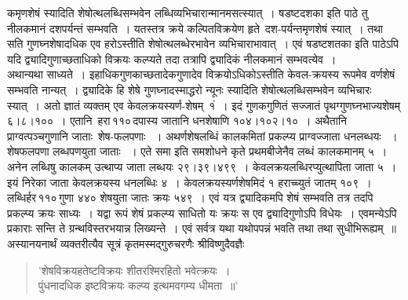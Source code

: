 \documentclass[11pt, openany]{book}
\begin{document}
\begin{sloppypar}
\noindent कमृणशेषं स्यादिति शेषोत्थलब्धिसम्भवेन लब्धिव्यभिचारान्मानमसत्स्यात्~। षडष्टदशका इति पाठे तु नीलकमानं दशपर्यन्तं सम्भवति~। यतस्तत्र क्रये कल्पितविक्रयेण हृते~दश-पर्यन्तमृणशेषं स्यात्~। तथा सति गुणघ्नशेषादधिक एव हरोऽस्तीति शेषोत्थलब्धेरभावेन व्यभिचाराभावात्~। एवं षडष्टशतका इति पाठेऽपि यदि द्व्यादिगुणाच्छताधिको विक्रयः कल्प्यते तदा तत्रापि द्व्यादिकं नीलकमानं सम्भवत्येव~।\\

अथान्यथा साध्यते~। इहाधिकगुणकाच्छतादेकगुणादेव विक्रयोऽधिकोऽस्तीति केवल-क्रयस्य रूपमेव वर्णशेषं सम्भवति नान्यत्~। द्व्यादिके हि शेषे गुणघ्नादस्माद्धरो न्यूनः स्यादिति शेषोत्थलब्धिसम्भवेन व्यभिचारः स्यात्~। अतो ज्ञातं व्यक्तम् एव केवलक्रयस्यर्ण-शेषम्~१ं~। इदं गुणकगुणितं सज्जातं पृथग्गुणघ्नभाज्यशेषम् ६।८।१००~। एतानि~हरा\textendash \,११०\textendash \,दपास्य जातानि धनशेषाणि १०४।१०२।१०~। अथैतानि प्राग्वत्पञ्चगुणानि जाताः~शेष-फलपणाः ~। अथर्णशेषलब्धिं कालकमितां प्रकल्प्य प्राग्वज्जाता धनलब्धयः ~। शेषफलपणा लब्धपणयुता जाताः ~। एते समा इति समशोधने कृते प्रथमबीजेनैव लब्धं कालकमानम् ५~। अनेन लब्धिषु कालकम् उत्थाप्य जाता लब्धयः २९।३९।४९९~। केवलक्रयलब्धिरप्युत्थापिता जाता ५~। इयं निरेका जाता केवलक्रयस्य धनलब्धिः ४~। केवलक्रयस्यर्णशेषमिदं १ हराच्च्युतं जातम् १०९~। लब्धिर्हर\textendash \,११०\textendash \,गुणा ४४० शेषयुता जातः क्रयः ५४९~। एवं यत्र द्व्यादिकमपि शेषं सम्भवति तत्र तदपि प्रकल्प्य क्रयः साध्यः~। यद्वा रूपं शेषं प्रकल्प्य साधितो यः क्रयः स एव द्व्यादिगुणोऽपि विधेयः~। एवमन्येऽपि प्रकाराः सन्ति ते ग्रन्थविस्तरभयान्न लिख्यन्ते~। एवं सर्वत्र यथा यथोपपन्नं भवति तथा तथा सुधीभिरूह्यम्~॥\\

अस्यानयनार्थं व्यक्तरीत्यैव सूत्रं कृतमस्मद्गुरुचरणैः {\color{violet}श्रीविष्णुदैवज्ञैः}\textendash

\begin{quote}
{\color{violet}'शेषविक्रयहतेष्टविक्रयः शीतरश्मिरहितो भवेत्क्रयः~।\\
पुंधनादधिक इष्टविक्रयः कल्प्य इत्थमवगम्य धीमता~॥'}
\end{quote}
\end{sloppypar}
\end{document}
